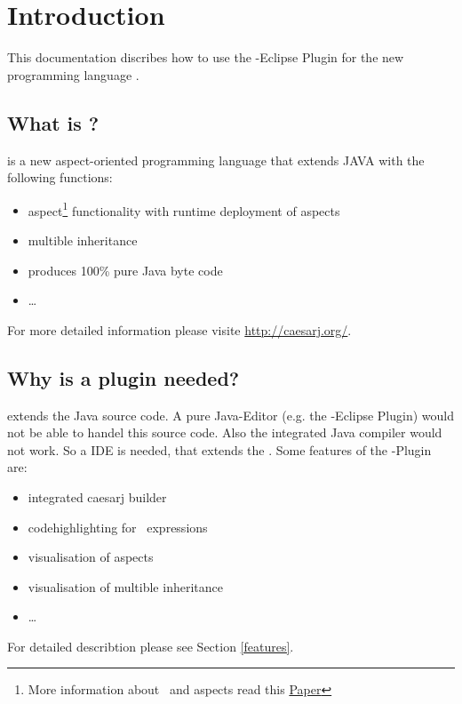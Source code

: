 \section{Introduction}
This documentation discribes how to use the \caesarj -Eclipse Plugin for the new programming language \caesarj.
\subsection{What is \caesarj ?}
\caesar is a new aspect-oriented programming language that extends JAVA with the following functions:
\begin{itemize}
	\item aspect\footnote{More information about \caesarj ~and aspects read this  \href{http://www.st.informatik.tu-darmstadt.de/database/publications/data/aosd03.pdf?id=70}{Paper}} functionality with runtime deployment of aspects
	\item multible inheritance
	\item produces 100\% pure Java byte code
	\item \dots
\end{itemize}
For more detailed information please visite \href{http://caesarj.org/}{http://caesarj.org/}.

\subsection{Why is a plugin needed?}
\caesarj  extends the Java source code. A pure Java-Editor (e.g. the \jdt -Eclipse Plugin) would not be able to handel this source code. Also the integrated Java compiler would not work. So a IDE is needed, that extends the \jdt. Some features of the \caesarj -Plugin are:
\begin{itemize}
	\item integrated caesarj builder
	\item codehighlighting for \caesarj ~expressions
	\item visualisation of aspects
	\item visualisation of multible inheritance
	\item \dots
\end{itemize}
For detailed describtion please see Section \ref{features}.


